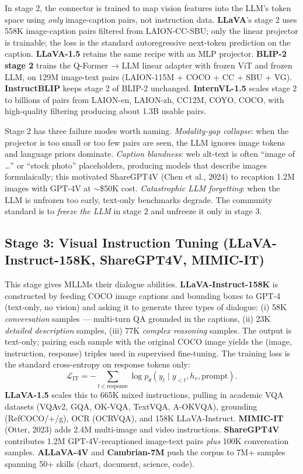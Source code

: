 In stage 2, the connector is trained to map vision features into the LLM's token space using \emph{only} image-caption pairs, not instruction data. \textbf{LLaVA}'s stage 2 uses 558K image-caption pairs filtered from LAION-CC-SBU; only the linear projector is trainable; the loss is the standard autoregressive next-token prediction on the caption. \textbf{LLaVA-1.5} retains the same recipe with an MLP projector. \textbf{BLIP-2 stage 2} trains the Q-Former → LLM linear adapter with frozen ViT and frozen LLM, on 129M image-text pairs (LAION-115M + COCO + CC + SBU + VG). \textbf{InstructBLIP} keeps stage 2 of BLIP-2 unchanged. \textbf{InternVL-1.5} scales stage 2 to billions of pairs from LAION-en, LAION-zh, CC12M, COYO, COCO, with high-quality filtering producing about 1.3B usable pairs.

Stage 2 has three failure modes worth naming. \emph{Modality-gap collapse}: when the projector is too small or too few pairs are seen, the LLM ignores image tokens and language priors dominate. \emph{Caption blandness}: web alt-text is often ``image of \ldots{}'' or ``stock photo'' placeholders, producing models that describe images formulaically; this motivated ShareGPT4V (Chen et al., 2024) to recaption 1.2M images with GPT-4V at \(\sim\)\$50K cost. \emph{Catastrophic LLM forgetting}: when the LLM is unfrozen too early, text-only benchmarks degrade. The community standard is to \emph{freeze the LLM} in stage 2 and unfreeze it only in stage 3.

\subsection{Stage 3: Visual Instruction Tuning (LLaVA-Instruct-158K, ShareGPT4V, MIMIC-IT)}\label{stage-3-visual-instruction-tuning-llava-instruct-158k-sharegpt4v-mimic-it}

This stage gives MLLMs their dialogue abilities. \textbf{LLaVA-Instruct-158K} is constructed by feeding COCO image captions and bounding boxes to GPT-4 (text-only, no vision) and asking it to generate three types of dialogue: (i) 58K \emph{conversation} samples --- multi-turn QA grounded in the captions, (ii) 23K \emph{detailed description} samples, (iii) 77K \emph{complex reasoning} samples. The output is text-only; pairing each sample with the original COCO image yields the (image, instruction, response) triples used in supervised fine-tuning. The training loss is the standard cross-entropy on response tokens only:
\[\mathcal{L}_{\text{IT}} = -\sum_{t \in \text{response}} \log p_\theta(y_t \mid y_{<t}, h_v, \text{prompt}).\]
\textbf{LLaVA-1.5} scales this to 665K mixed instructions, pulling in academic VQA datasets (VQAv2, GQA, OK-VQA, TextVQA, A-OKVQA), grounding (RefCOCO/+/g), OCR (OCRVQA), and 158K LLaVA-Instruct. \textbf{MIMIC-IT} (Otter, 2023) adds 2.4M multi-image and video instructions. \textbf{ShareGPT4V} contributes 1.2M GPT-4V-recaptioned image-text pairs \emph{plus} 100K conversation samples. \textbf{ALLaVA-4V} and \textbf{Cambrian-7M} push the corpus to 7M+ samples spanning 50+ skills (chart, document, science, code).

